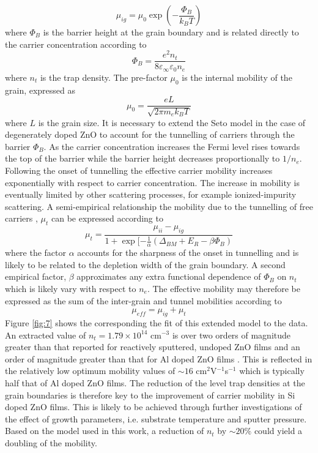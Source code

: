 \documentclass[final,5p,times]{elsarticle}
\begin{document}
\begin{equation}
\label{eqn:10}
\mu_{ig} = \mu_0\exp(-\frac{\Phi_B}{k_BT})
\end{equation}
where $\Phi_B$ is the barrier height at the grain boundary and is related directly to the carrier concentration according to
\begin{equation}
\label{eqn:11}
\Phi_B=\frac{e^2n_t}{8\varepsilon_{\infty}\varepsilon_0n_e}
\end{equation}
where $n_t$ is the trap density. The pre-factor $\mu_0$ is the internal mobility of the grain, expressed as
\begin{equation}
\label{eqn:12}
\mu_0=\frac{eL}{\sqrt{2\pi m_ek_BT}}
\end{equation}
where $L$ is the grain size. It is necessary to extend the Seto model in the case of degenerately doped ZnO to account for the tunnelling of carriers through the barrier $\Phi_B$. As the carrier concentration increases the Fermi level rises towards the top of the barrier while the barrier height decreases proportionally to $1/n_e$. Following the onset of tunnelling the effective carrier mobility increases exponentially with respect to carrier concentration. The increase in mobility is eventually limited by other scattering processes, for example ionized-impurity scattering. A semi-empirical relationship the mobility due to the tunnelling of free carriers , $\mu_t$ can be expressed according to
\begin{equation}
\label{eqn:13}
\mu_t = \frac{\mu_{ii}-\mu_{ig}}{1+\exp[-\frac{1}{\alpha}(\Delta_{BM}+E_R-\beta\Phi_B)}
\end{equation}
where the factor $\alpha$ accounts for the sharpness of the onset in tunnelling and is likely to be related to the depletion width of the grain boundary. A second empirical factor, $\beta$ approximates any extra functional dependence of $\Phi_B$ on $n_t$ which is likely vary with respect to $n_e$. The effective mobility may therefore be expressed as the sum of the inter-grain and tunnel mobilities according to
\begin{equation}
\label{eqn:14}
\mu_{eff} = \mu_{ig}+\mu_{t}
\end{equation}
Figure \ref{fig:7} shows the corresponding the fit of this extended model to the data. An extracted value of $n_t = 1.79\times10^{14}$ cm$^{-3}$ is over two orders of magnitude greater than that reported for reactively sputtered, undoped ZnO films \cite{Carcia2003} and an order of magnitude greater than that for Al doped ZnO films \cite{Shigesato2003}. This is reflected in the relatively low optimum mobility values of $\sim16$ cm$^{2}$V$^{-1}$s$^{-1}$ which is typically half that of Al doped ZnO films. The reduction of the level trap densities at the grain boundaries is therefore key to the improvement of carrier mobility in Si doped ZnO films. This is likely to be achieved through further investigations of the effect of growth parameters, i.e. substrate temperature and sputter pressure. Based on the model used in this work, a reduction of $n_t$ by $\sim20\%$ could yield a doubling of the mobility.
\end{document}
